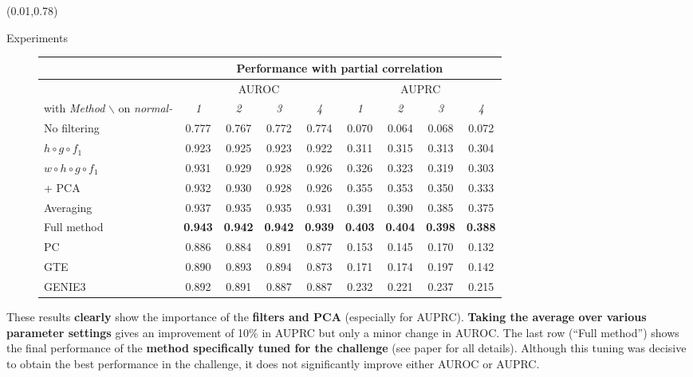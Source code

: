 \documentclass[final]{beamer}
\begin{document}
\begin{frame}{}
\begin{textblock}{0.485}
\end{textblock}


\begin{textblock}{0.74}(0.01,0.78)

\begin{block}{Experiments \phantom{p}}

\vspace{-5pt}
\begin{figure}
\centering
\tiny
\begin{tabular}{| l | c c c c | c c c c |}
\hline
& \multicolumn{8}{c|}{Performance with partial correlation}\\ \hline
& \multicolumn{4}{c|}{AUROC} & \multicolumn{4}{c|}{AUPRC} \\
with \textit{Method} $\backslash$ on \textit{normal-} & \textit{1} & \textit{2} & \textit{3} & \textit{4} & \textit{1} & \textit{2} & \textit{3} & \textit{4} \\
\hline
\hline
No  filtering       					& 0.777 & 0.767 & 0.772 & 0.774 & 0.070 & 0.064 & 0.068 & 0.072\\
$ h \circ g \circ f_1$                  & 0.923 & 0.925 & 0.923 & 0.922 & 0.311 & 0.315 & 0.313 & 0.304\\
$ w \circ h \circ g \circ f_1$          & 0.931 & 0.929 & 0.928 & 0.926 & 0.326 & 0.323 & 0.319 & 0.303\\
+ PCA         							& 0.932 & 0.930 & 0.928 & 0.926 & 0.355 & 0.353 & 0.350 & 0.333\\
Averaging           					& 0.937 & 0.935 & 0.935 & 0.931 & 0.391 &  0.390 &  0.385 & 0.375\\
Full method           					& \textbf{0.943} & \textbf{0.942} & \textbf{0.942} & \textbf{0.939} & \textbf{0.403} & \textbf{0.404} & \textbf{0.398} & \textbf{0.388}\\
\hline
PC & 0.886 & 0.884 & 0.891 &  0.877 & 0.153 & 0.145 & 0.170 & 0.132\\
GTE & 0.890 & 0.893 & 0.894 & 0.873 & 0.171 & 0.174 & 0.197 & 0.142\\
GENIE3 & 0.892 & 0.891 & 0.887 & 0.887 & 0.232 & 0.221 & 0.237 & 0.215 \\
\hline
\end{tabular}
\end{figure}

These results \textbf{clearly} show the importance of the \textbf{filters and PCA} (especially for AUPRC). \textbf{Taking the average over
various parameter settings} gives an improvement of 10\% in AUPRC but
only a minor change in AUROC. The last row (``Full method'') shows the
final performance of the \textbf{method specifically tuned for the challenge}
(see paper for all details). Although this
tuning was decisive to obtain the best performance in the challenge,
it does not significantly improve either AUROC or AUPRC.\\[1ex]


\end{block}
\end{textblock}
\end{frame}
\end{document}
